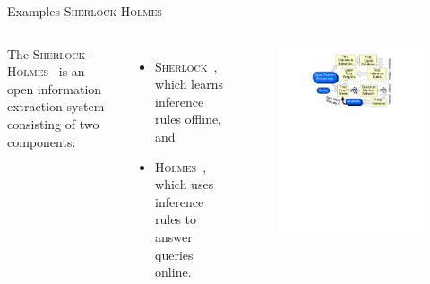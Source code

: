 \documentclass[onlymath,xcolor=pdftex,dvipsnames,table]{beamer}
\newcommand{\sherlock}{\textsc{Sherlock}\xspace}
\newcommand{\holmes}{\textsc{Holmes}\xspace}
\newcommand{\head}[1]{{\large\color{OliveGreen}#1\\[2pt]}}
\begin{document}
\begin{frame}{Examples}
\head{\sherlock-\holmes}
\begin{columns}[c]
  The \sherlock-\holmes~\cite{schoenmackers2011inference} is an open information extraction system consisting of two components:
  \begin{itemize}
    \item \sherlock~\cite{schoenmackers2010learning}, which learns inference rules offline, and
    \item \holmes~\cite{schoenmackers2008scaling}, which uses inference rules to answer queries online.
  \end{itemize}

  \begin{figure}
    \centering
    \includegraphics[clip,trim=125pt 500pt 125pt 30pt,width=\linewidth]{sherlock.pdf}
  \end{figure}
\end{columns}
\end{frame}
\end{document}
